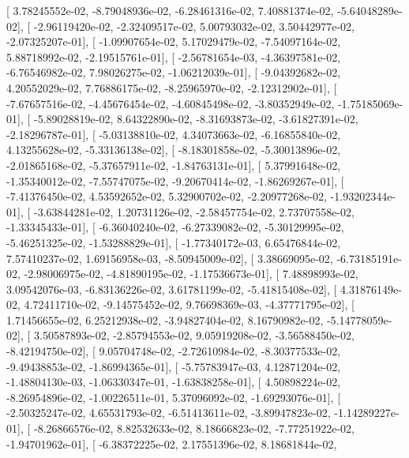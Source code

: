 \documentclass{article}
\begin{document}
       [  3.78245552e-02,  -8.79048936e-02,  -6.28461316e-02,
          7.40881374e-02,  -5.64048289e-02],
       [ -2.96119420e-02,  -2.32409517e-02,   5.00793032e-02,
          3.50442977e-02,  -2.07325207e-01],
       [ -1.09907654e-02,   5.17029479e-02,  -7.54097164e-02,
          5.88718992e-02,  -2.19515761e-01],
       [ -2.56781654e-03,  -4.36397581e-02,  -6.76546982e-02,
          7.98026275e-02,  -1.06212039e-01],
       [ -9.04392682e-02,   4.20552029e-02,   7.76886175e-02,
         -8.25965970e-02,  -2.12312902e-01],
       [ -7.67657516e-02,  -4.45676454e-02,  -4.60845498e-02,
         -3.80352949e-02,  -1.75185069e-01],
       [ -5.89028819e-02,   8.64322890e-02,  -8.31693873e-02,
         -3.61827391e-02,  -2.18296787e-01],
       [ -5.03138810e-02,   4.34073663e-02,  -6.16855840e-02,
          4.13255628e-02,  -5.33136138e-02],
       [ -8.18301858e-02,  -5.30013896e-02,  -2.01865168e-02,
         -5.37657911e-02,  -1.84763131e-01],
       [  5.37991648e-02,  -1.35340012e-02,  -7.55747075e-02,
         -9.20670414e-02,  -1.86269267e-01],
       [ -7.41376450e-02,   4.53592652e-02,   5.32900702e-02,
         -2.20977268e-02,  -1.93202344e-01],
       [ -3.63844281e-02,   1.20731126e-02,  -2.58457754e-02,
          2.73707558e-02,  -1.33345433e-01],
       [ -6.36040240e-02,  -6.27339082e-02,  -5.30129995e-02,
         -5.46251325e-02,  -1.53288829e-01],
       [ -1.77340172e-03,   6.65476844e-02,   7.57410237e-02,
          1.69156958e-03,  -8.50945009e-02],
       [  3.38669095e-02,  -6.73185191e-02,  -2.98006975e-02,
         -4.81890195e-02,  -1.17536673e-01],
       [  7.48898993e-02,   3.09542076e-03,  -6.83136226e-02,
          3.61781199e-02,  -5.41815408e-02],
       [  4.31876149e-02,   4.72411710e-02,  -9.14575452e-02,
          9.76698369e-03,  -4.37771795e-02],
       [  1.71456655e-02,   6.25212938e-02,  -3.94827404e-02,
          8.16790982e-02,  -5.14778059e-02],
       [  3.50587893e-02,  -2.85794553e-02,   9.05919208e-02,
         -3.56588450e-02,  -8.42194750e-02],
       [  9.05704748e-02,  -2.72610984e-02,  -8.30377533e-02,
         -9.49438853e-02,  -1.86994365e-01],
       [ -5.75783947e-03,   4.12871204e-02,  -1.48804130e-03,
         -1.06330347e-01,  -1.63838258e-01],
       [  4.50898224e-02,  -8.26954896e-02,  -1.00226511e-01,
          5.37096092e-02,  -1.69293076e-01],
       [ -2.50325247e-02,   4.65531793e-02,  -6.51413611e-02,
         -3.89947823e-02,  -1.14289227e-01],
       [ -8.26866576e-02,   8.82532633e-02,   8.18666823e-02,
         -7.77251922e-02,  -1.94701962e-01],
       [ -6.38372225e-02,   2.17551396e-02,   8.18681844e-02,
\end{document}

